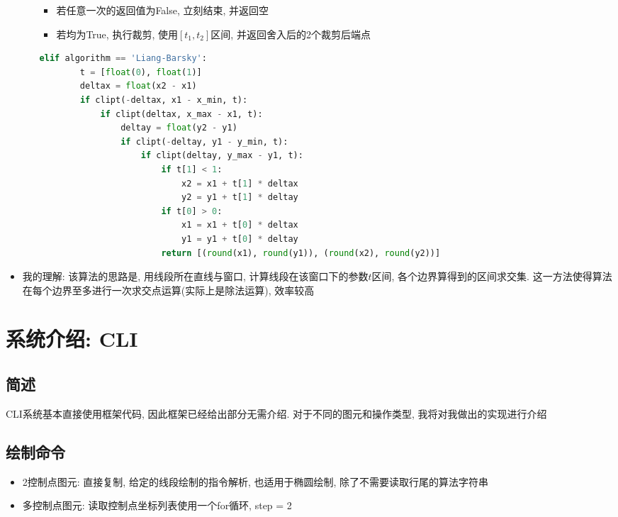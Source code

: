 \documentclass[a4paper,UTF8]{article}
\theoremstyle{definition}
\begin{document}
\begin{itemize}
\begin{enumerate}
\begin{itemize}
      \item 若任意一次的返回值为False, 立刻结束, 并返回空
      \item 若均为True, 执行裁剪, 使用$[t_1,t_2]$区间, 并返回舍入后的2个裁剪后端点
    \end{itemize}
  \begin{lstlisting}[language={Python}] 
    elif algorithm == 'Liang-Barsky':
        t = [float(0), float(1)]
        deltax = float(x2 - x1)
        if clipt(-deltax, x1 - x_min, t):
            if clipt(deltax, x_max - x1, t):
                deltay = float(y2 - y1)
                if clipt(-deltay, y1 - y_min, t):
                    if clipt(deltay, y_max - y1, t):
                        if t[1] < 1:
                            x2 = x1 + t[1] * deltax
                            y2 = y1 + t[1] * deltay
                        if t[0] > 0:
                            x1 = x1 + t[0] * deltax
                            y1 = y1 + t[0] * deltay
                        return [(round(x1), round(y1)), (round(x2), round(y2))]\end{lstlisting}
  \end{enumerate}
  \item 我的理解: 该算法的思路是, 用线段所在直线与窗口, 计算线段在该窗口下的参数$t$区间, 各个边界算得到的区间求交集. 这一方法使得算法在每个边界至多进行一次求交点运算(实际上是除法运算), 效率较高
\end{itemize}

\section{系统介绍: CLI}
\subsection{简述}
CLI系统基本直接使用框架代码, 因此框架已经给出部分无需介绍. 对于不同的图元和操作类型, 我将对我做出的实现进行介绍
\subsection{绘制命令}
\begin{itemize}
  \item 2控制点图元: 直接复制, 给定的线段绘制的指令解析, 也适用于椭圆绘制, 除了不需要读取行尾的算法字符串
  \item 多控制点图元: 读取控制点坐标列表使用一个for循环, step = 2
\end{itemize}
\end{document}

